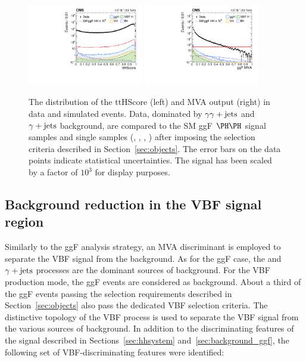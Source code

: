 \documentclass[11pt,twoside,a4paper,cmspaper,final,collab]{cms-tdr}
\begin{document}
\begin{figure}[thb]
  \centering
  \includegraphics[width=0.45\textwidth]{Figure_005-a.pdf}\hfil 
  \includegraphics[width=0.45\textwidth]{Figure_005-b.pdf}\hfil 
  \caption{The distribution of the ttHScore (left) and MVA output (right) in data and simulated events. Data, dominated by $\gamma\gamma+\text{jets}$ and $\gamma+\text{jets}$ background, are compared to the SM ggF $\HH$ signal samples and single \PH samples (\ttH, \ggH, \VBFH, \VH) after imposing the selection criteria described in Section~\ref{sec:objects}. The error bars on the data points indicate statistical uncertainties. The \HH signal has been scaled by a factor of $10^{3}$ for display purposes. }
  \label{fig:cumulative}
\end{figure}




\subsection{Background reduction in the VBF \texorpdfstring{\HH}{HH} signal region}
\label{sec:background_vbf}

Similarly to the ggF \HH analysis strategy, an MVA discriminant is employed to separate the VBF \HH signal from the background. As for the ggF case, the \DIPHO and $\gamma+\text{jets}$ processes are the dominant sources of background. For the VBF production mode, the ggF \HH events are considered as background.
About a third of the ggF \HH events passing the selection requirements described in Section~\ref{sec:objects} also pass the dedicated VBF selection criteria. The distinctive topology of the VBF \HH process is used to separate the VBF \HH signal from the various sources of background. In addition to the discriminating features of the \HH signal described in Sections~\ref{sec:hhsystem} and~\ref{sec:background_ggf}, the following set of VBF-discriminating features were identified: 
\end{document}
